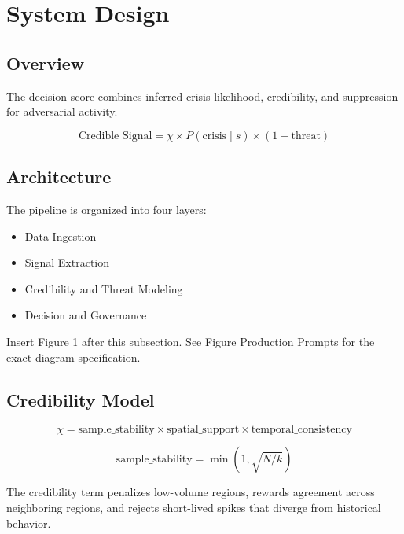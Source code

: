 \documentclass[11pt]{article}
\begin{document}
\section{System Design}

\subsection{Overview}

The decision score combines inferred crisis likelihood, credibility, and suppression for adversarial activity.

\begin{equation*}
\text{Credible Signal} = \chi \times P(\text{crisis} \mid s) \times (1 - \text{threat})
\end{equation*}

\subsection{Architecture}

The pipeline is organized into four layers:

\begin{itemize}[leftmargin=*]
\item Data Ingestion
\item Signal Extraction
\item Credibility and Threat Modeling
\item Decision and Governance
\end{itemize}

Insert Figure 1 after this subsection. See Figure Production Prompts for the exact diagram specification.

\subsection{Credibility Model}

\begin{equation*}
\chi = \text{sample\_stability} \times \text{spatial\_support} \times \text{temporal\_consistency}
\end{equation*}

\begin{equation*}
\text{sample\_stability} = \min(1, \sqrt{N / k})
\end{equation*}

The credibility term penalizes low-volume regions, rewards agreement across neighboring regions, and rejects short-lived spikes that diverge from historical behavior.
\end{document}
